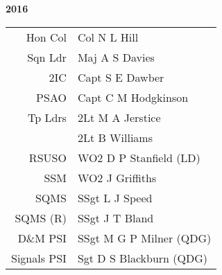 \begin{center}
  \Huge
  \textbf{2016}
\end{center}

\begin{center}
  \small
  \begin{tabular}{rl}
    Hon Col & Col N L Hill \\
    Sqn Ldr & Maj A S Davies \\
    2IC & Capt S E Dawber \\
    PSAO & Capt C M Hodgkinson \\
    Tp Ldrs & 2Lt M A Jerstice \\
     & 2Lt B Williams \\
    RSUSO & WO2 D P Stanfield (LD) \\
    SSM & WO2 J Griffiths \\
    SQMS & SSgt L J Speed \\
    SQMS (R) & SSgt J T Bland \\
    D\&M PSI & SSgt M G P Milner (QDG) \\
    Signals PSI & Sgt D S Blackburn (QDG) \\
  \end{tabular}
\end{center}

